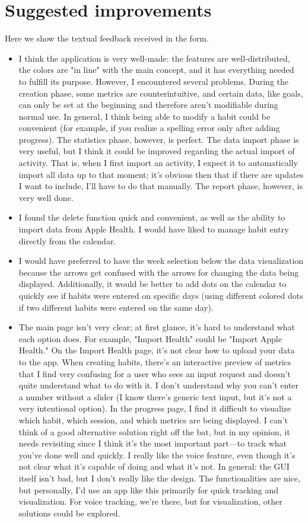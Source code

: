 \documentclass{article}
\begin{document}
\section{Suggested improvements}
Here we show the textual feedback received in the form.
\begin{itemize}
	\item I think the application is very well-made: the features are well-distributed, the colors are "in line" with the main concept, and it has everything needed to fulfill its purpose. However, I encountered several problems. During the creation phase, some metrics are counterintuitive, and certain data, like goals, can only be set at the beginning and therefore aren't modifiable during normal use. In general, I think being able to modify a habit could be convenient (for example, if you realize a spelling error only after adding progress). The statistics phase, however, is perfect. The data import phase is very useful, but I think it could be improved regarding the actual import of activity. That is, when I first import an activity, I expect it to automatically import all data up to that moment; it's obvious then that if there are updates I want to include, I'll have to do that manually. The report phase, however, is very well done.
	\item I found the delete function quick and convenient, as well as the ability to import data from Apple Health. I would have liked to manage habit entry directly from the calendar.
	\item I would have preferred to have the week selection below the data visualization because the arrows get confused with the arrows for changing the data being displayed. Additionally, it would be better to add dots on the calendar to quickly see if habits were entered on specific days (using different colored dots if two different habits were entered on the same day).
	\item The main page isn't very clear; at first glance, it's hard to understand what each option does. For example, "Import Health" could be "Import Apple Health." On the Import Health page, it's not clear how to upload your data to the app. When creating habits, there's an interactive preview of metrics that I find very confusing for a user who sees an input request and doesn't quite understand what to do with it. I don't understand why you can't enter a number without a slider (I know there's generic text input, but it's not a very intentional option). In the progress page, I find it difficult to visualize which habit, which session, and which metrics are being displayed. I can't think of a good alternative solution right off the bat, but in my opinion, it needs revisiting since I think it's the most important part—to track what you've done well and quickly. I really like the voice feature, even though it's not clear what it's capable of doing and what it's not. In general: the GUI itself isn't bad, but I don't really like the design. The functionalities are nice, but personally, I'd use an app like this primarily for quick tracking and visualization. For voice tracking, we're there, but for visualization, other solutions could be explored.

\end{itemize}
\end{document}

